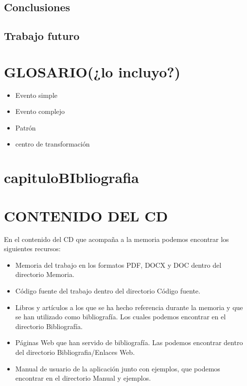 \documentclass[spanish,twoside,openright,12pt,a4paper]{book}
\begin{document}
\section{Conclusiones}


\section{Trabajo futuro}

\chapter{GLOSARIO(¿lo incluyo?)}
\label{capituloGlosario}

\begin{itemize}
\item Evento simple
\item Evento complejo
\item Patrón


\item centro de transformación
\end{itemize}

\renewcommand{\refname}{BIBLIOGRAFÍA}



\chapter{capituloBIbliografia}

\chapter*{CONTENIDO DEL CD}
En el contenido del CD que acompaña a la memoria podemos encontrar los
siguientes recursos:
\begin{itemize}
 \item Memoria del trabajo en los formatos PDF, DOCX y DOC dentro del directorio
Memoria.
 \item Código fuente del trabajo dentro del directorio Código fuente.
 \item Libros y artículos a los que se ha hecho referencia durante la memoria y que se han
utilizado como bibliografía. Los cuales podemos encontrar en el directorio
Bibliografía.
 \item Páginas Web que han servido de bibliografía. Las podemos encontrar dentro del
directorio Bibliografia/Enlaces Web.
 \item Manual de usuario de la aplicación junto con ejemplos, que podemos encontrar en
el directorio Manual y ejemplos.
\end{itemize}
\end{document}
